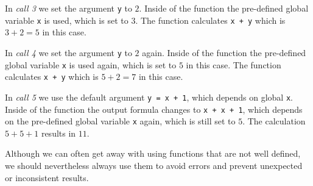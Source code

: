 \documentclass[11,]{article}
\begin{document}
In \emph{call 3} we set the argument \texttt{y} to \(2\). Inside of the
function the pre-defined global variable \texttt{x} is used, which is
set to \(3\). The function calculates \texttt{x\ +\ y} which is
\(3 + 2 = 5\) in this case.

In \emph{call 4} we set the argument \texttt{y} to \(2\) again. Inside
of the function the pre-defined global variable \texttt{x} is used
again, which is set to \(5\) in this case. The function calculates
\texttt{x\ +\ y} which is \(5 + 2 = 7\) in this case.

In \emph{call 5} we use the default argument \texttt{y\ =\ x\ +\ 1},
which depends on global \texttt{x}. Inside of the function the output
formula changes to \texttt{x\ +\ x\ +\ 1}, which depends on the
pre-defined global variable \texttt{x} again, which is still set to
\(5\). The calculation \(5 + 5 + 1\) results in \(11\).

Although we can often get away with using functions that are not well
defined, we should nevertheless always use them to avoid errors and
prevent unexpected or inconsistent results.
\end{document}
